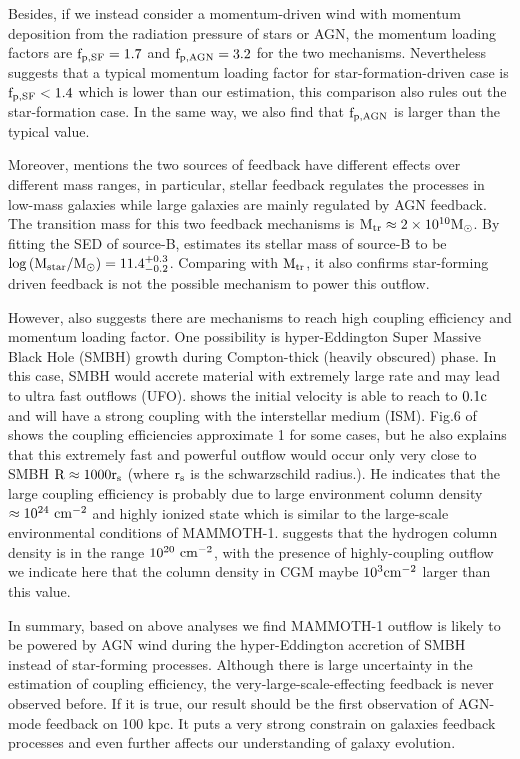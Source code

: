\documentclass{subfiles}
\begin{document}
	 Besides, if we instead consider a momentum-driven wind with momentum deposition from the radiation pressure of stars or AGN, the momentum loading factors are $\rm f_{p,SF}=1.7$ and $\rm f_{p,AGN}=3.2$ for the two mechanisms. Nevertheless \citet{zubovas2018agn} suggests that a typical momentum loading factor for star-formation-driven case is $\rm f_{p,SF}< 1.4$ which is lower than our estimation, this comparison also rules out the star-formation case. In the same way, we also find that $\rm f_{p,AGN}$ is larger than the typical value. 
	 
	 Moreover, \citet{shankar2006new} mentions the two sources of feedback have different effects over different mass ranges, in particular, stellar feedback regulates the processes in low-mass galaxies while large galaxies are mainly regulated by AGN feedback. The transition mass for this two feedback mechanisms is $\rm M_{tr} \approx 2 \times 10^{10} \mathrm{M}_{\odot} $. By fitting the SED of source-B, \citet{arrigoni2018qso} estimates its stellar mass of source-B to be $\rm \log \left(M_{\mathrm{star}} / M_{\odot}\right)=11.4_{-0.2}^{+0.3}$. Comparing with $\rm M_{tr}$, it also confirms star-forming driven feedback is not the possible mechanism to power this outflow.
	 
	 However, \citet{zubovas2018agn} also suggests there are mechanisms to reach high coupling efficiency and momentum loading factor. One possibility is hyper-Eddington Super Massive Black Hole (SMBH) growth during Compton-thick (heavily obscured) phase. In this case, SMBH would accrete material with extremely large rate and may lead to ultra fast outflows (UFO).  \citet{tombesi2013unification} shows the initial velocity is able to reach to $\rm 0.1c$ and will have a strong coupling with the interstellar medium (ISM). Fig.6 of \citet{tombesi2013unification} shows the coupling efficiencies approximate 1 for some cases, but he also explains that this extremely fast and powerful outflow would occur only very close to SMBH $\rm R \approx 1000r_{s}$ (where $\rm r_{s}$ is the schwarzschild radius.).  He indicates that the large coupling efficiency is probably due to large environment column density $\rm \approx 10^{24} \ cm^{-2}$ and highly ionized state which is similar to the large-scale environmental conditions of MAMMOTH-1. \citet{cai2017discovery} suggests that the hydrogen column density is in the range $\rm 10^{20} \ cm^{-2}$, with the presence of highly-coupling outflow we indicate here that the column density in CGM maybe $\rm 10^{3} cm^{-2}$ larger than this value. 
	 
	 In summary, based on above analyses we find MAMMOTH-1 outflow is likely to be powered by AGN wind during the hyper-Eddington accretion of SMBH instead of star-forming processes. Although there is large uncertainty in the estimation of coupling efficiency, the very-large-scale-effecting feedback is never observed before. If it is true, our result should be the first observation of AGN-mode feedback on 100 kpc. It puts a very strong constrain on galaxies feedback processes and even further affects our understanding of galaxy evolution.
\end{document}
